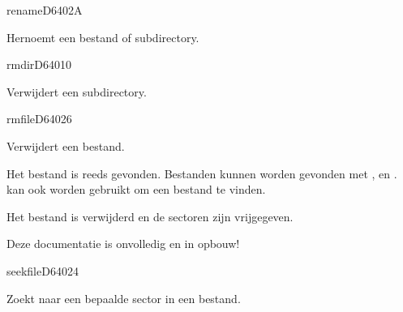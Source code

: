\newpage
\begin{hyppotrap}{rename}{D640}{2A}

\item [Dienst:]  Hernoemt een bestand of subdirectory.
\item [Foutcodes:]  
\notimplemented
\end{hyppotrap}


\begin{hyppotrap}{rmdir}{D640}{10}
\item [Dienst:]  Verwijdert een subdirectory.
\notimplemented
\end{hyppotrap}


\begin{hyppotrap}{rmfile}{D640}{26}

\item [Dienst:]  Verwijdert een bestand.
\item [Voorbeding:]  Het bestand is reeds gevonden. Bestanden kunnen worden gevonden met ,   en .  kan ook worden gebruikt om een bestand te vinden.
\item [Nawerking:]  Het bestand is verwijderd en de sectoren zijn vrijgegeven.
\item [Geschiedenis:]
\item [Opmerkingen:]  Deze documentatie is onvolledig en in opbouw!
\end{hyppotrap}


\begin{hyppotrap}{seekfile}{D640}{24}
\item [Dienst:]  Zoekt naar een bepaalde sector in een bestand.
\notimplemented
\end{hyppotrap}


